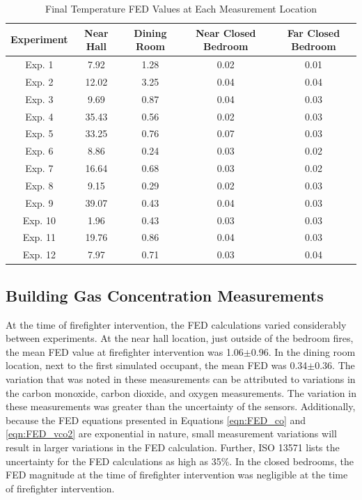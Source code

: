 \documentclass[12pt,oneside]{article}
\begin{document}
\begin{table}[!ht]
    \centering
    \caption{Final Temperature FED Values at Each Measurement Location}
    \label{tab:temp_fed}
    \begin{tabular}{ccccc}
    \toprule[1.5pt]
	\textbf{Experiment}  &   \textbf{Near Hall}& \textbf{Dining Room}& \textbf{Near Closed Bedroom}& \textbf{Far Closed Bedroom} \\ 
	\midrule                                                                   
	Exp. 1 &7.92        & 1.28        		& 0.02     & 0.01        \\  
	Exp. 2 &12.02       & 3.25       		& 0.04     & 0.04        \\
	Exp. 3 & 9.69    	& 0.87        		& 0.04     & 0.03        \\               
	Exp. 4 & 35.43      & 0.56         		& 0.02     & 0.03        \\                
	Exp. 5 & 33.25      & 0.76          	& 0.07     & 0.03        \\                 
	Exp. 6 & 8.86       & 0.24         		& 0.03     & 0.02        \\                 
	Exp. 7 & 16.64      & 0.68         		& 0.03     & 0.02        \\                
	Exp. 8 & 9.15       & 0.29         		& 0.02     & 0.03        \\            
	Exp. 9 & 39.07      & 0.43          	& 0.04     & 0.03        \\              
	Exp. 10& 1.96       & 0.43          	& 0.03     & 0.03        \\         
	Exp. 11& 19.76      & 0.86           	& 0.04     & 0.03        \\             
	Exp. 12& 7.97       & 0.71          	& 0.03     & 0.04        \\           
	\bottomrule[1.25pt] 

    \end{tabular}
\end{table}                   
\subsection{Building Gas Concentration Measurements}
\label{subsec:gas}
At the time of firefighter intervention, the FED calculations varied considerably between experiments. At the near hall location, just outside of the bedroom fires,  the mean FED value at firefighter intervention was 1.06$\pm$0.96. In the dining room location, next to the first simulated occupant, the mean FED was 0.34$\pm$0.36. The variation that was noted in these measurements can be attributed to variations in the carbon monoxide, carbon dioxide, and oxygen measurements. The variation in these measurements was greater than the uncertainty of the sensors. Additionally, because the FED equations presented in Equations \ref{eqn:FED_co} and \ref{eqn:FED_vco2} are exponential in nature, small measurement variations will result in larger variations in the FED calculation. Further, ISO 13571 \cite{ISO13571} lists the uncertainty for the FED calculations as high as 35\%. In the closed bedrooms, the FED magnitude at the time of firefighter intervention was negligible at the time of firefighter intervention. 
\end{document}
